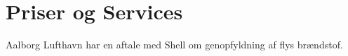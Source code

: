 \section{Priser og Services}

Aalborg Lufthavn har en aftale med Shell om genopfyldning af flys brændstof.
